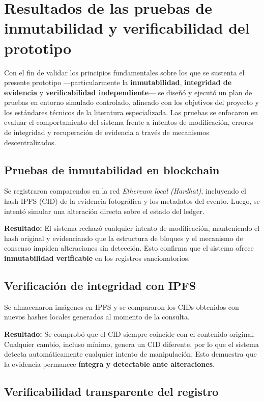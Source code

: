 \section{Resultados de las pruebas de inmutabilidad y verificabilidad del prototipo}

Con el fin de validar los principios fundamentales sobre los que se sustenta el presente prototipo —particularmente la \textbf{inmutabilidad}, \textbf{integridad de evidencia} y \textbf{verificabilidad independiente}— se diseñó y ejecutó un plan de pruebas en entorno simulado controlado, alineado con los objetivos del proyecto y los estándares técnicos de la literatura especializada. Las pruebas se enfocaron en evaluar el comportamiento del sistema frente a intentos de modificación, errores de integridad y recuperación de evidencia a través de mecanismos descentralizados.

\subsection{Pruebas de inmutabilidad en blockchain}

Se registraron comparendos en la red \textit{Ethereum local (Hardhat)}, incluyendo el hash IPFS (CID) de la evidencia fotográfica y los metadatos del evento. Luego, se intentó simular una alteración directa sobre el estado del ledger.

\textbf{Resultado:} El sistema rechazó cualquier intento de modificación, manteniendo el hash original y evidenciando que la estructura de bloques y el mecanismo de consenso impiden alteraciones sin detección. Esto confirma que el sistema ofrece \textbf{inmutabilidad verificable} en los registros sancionatorios.

\subsection{Verificación de integridad con IPFS}

Se almacenaron imágenes en IPFS y se compararon los CIDs obtenidos con nuevos hashes locales generados al momento de la consulta.

\textbf{Resultado:} Se comprobó que el CID siempre coincide con el contenido original. Cualquier cambio, incluso mínimo, genera un CID diferente, por lo que el sistema detecta automáticamente cualquier intento de manipulación. Esto demuestra que la evidencia permanece \textbf{íntegra y detectable ante alteraciones}.

\subsection{Verificabilidad transparente del registro}

